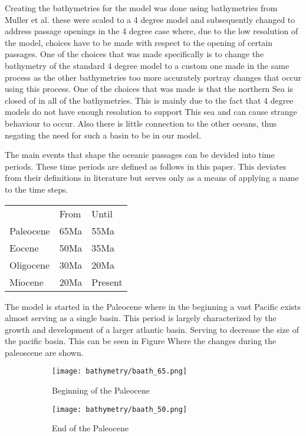 Creating the bathymetries for the model was done using bathymetries from Muller et al.\cite{Muller2008Mar} these were scaled to a 4 degree model and subsequently changed to address passage openings in the 4 degree case where, due to the low resolution of the model, choices have to be made with respect to the opening of certain passages. One of the choices that was made specifically is to change the bathymetry of the standard 4 degree model to a custom one made in the same process as the other bathymetries too more accurately portray changes that occur using this process. One of the choices that was made is that the northern Sea is closed of in all of the bathymetries. This is mainly due to the fact that 4 degree models do not have enough resolution to support This sea and can cause strange behaviour to occur. Also there is little connection to the other oceans, thus negating the need for such a basin to be in our model.

The main events that shape the oceanic passages can be devided into time periods. These time periods are defined as follows in this paper. This deviates from their definitions in literature but serves only as a means of applying a name to the time steps.

\begin{table}[H]
	\begin{tabular}{lll}
		&From &Until \\
		Paleocene & 65Ma&55Ma    \\
		Eocene    & 50Ma&35Ma     \\
		Oligocene & 30Ma&20Ma    \\
		Miocene   & 20Ma&Present 
	\end{tabular}
\end{table}

The model is started in the Paleocene where in the beginning a vast Pacific exists almost serving as a single basin. This period is largely characterized by the growth and development of a larger atlantic basin. Serving to decrease the size of the pacific basin. This can be seen in Figure %
Where the changes during the paleoscene are shown.
\begin{figure}[H]
	
	
	\centering
	\begin{subfigure}[b]{\linewidth}
		\centering
		\texttt{[image: bathymetry/baath\_65.png]}
		\caption{Beginning of the Paleocene}
	\end{subfigure}
\begin{subfigure}[b]{\linewidth}
	\centering
	\texttt{[image: bathymetry/baath\_50.png]}
	\caption{End of the Paleocene}
\end{subfigure}
	\caption{}
	\label{fig:paleocene_bath}
\end{figure}


